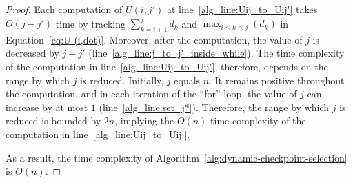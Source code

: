 \begin{theorem}
\begin{proof}
Each computation of $U(i, j')$ at line~\ref{alg_line:Uij_to_Uij'} takes $O(j - j')$ time by tracking $\displaystyle\sum_{k = i+1}^{j} d_k$ and $\displaystyle\max_{i \leq k \leq j}(d_k)$ in Equation~\ref{eq:U-(i,dot)}.
Moreover, after the computation, the value of $j$ is decreased by $j - j'$ (line~\ref{alg_line:j_to_j'_inside_while}).
The time complexity of the computation in line~\ref{alg_line:Uij_to_Uij'}, therefore, depends on the range by which $j$ is reduced.
Initially, $j$ equals $n$.
It remains positive throughout the computation, and in each iteration of the ``for'' loop, the value of $j$ can increase by at most $1$ (line~\ref{alg_line:set_j*}).
Therefore, the range by which $j$ is reduced is bounded by $2n$, implying the $O(n)$ time complexity of the computation in line~\ref{alg_line:Uij_to_Uij'}.

As a result, the time complexity of Algorithm~\ref{alg:dynamic-checkpoint-selection} is $O(n)$.
\end{proof}
\end{theorem}
